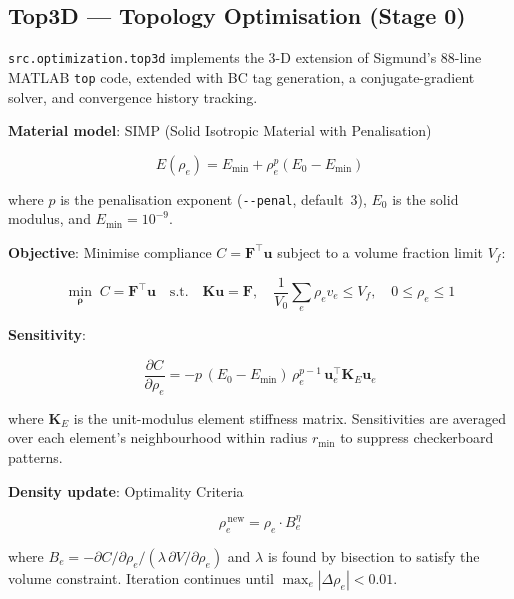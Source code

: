 \documentclass[a4paper, 11pt, openany]{report}
\begin{document}
\subsection{Top3D --- Topology Optimisation (Stage 0)}
\label{sec:alg-top3d}

\texttt{src.optimization.top3d} implements the 3-D extension of Sigmund's
88-line MATLAB \texttt{top} code, extended with BC tag generation, a
conjugate-gradient solver, and convergence history tracking.

\textbf{Material model}: SIMP (Solid Isotropic Material with Penalisation)

\begin{equation}
\label{eq:simp}
E(\rho_e) = E_{\min} + \rho_e^p (E_0 - E_{\min})
\end{equation}

where $p$ is the penalisation exponent (\texttt{-{}-penal}, default~3),
$E_0$ is the solid modulus, and $E_{\min} = 10^{-9}$.

\textbf{Objective}: Minimise compliance $C = \mathbf{F}^\top \mathbf{u}$
subject to a volume fraction limit $V_f$:

\begin{equation}
\label{eq:top3d-obj}
\min_{\boldsymbol{\rho}} \; C = \mathbf{F}^\top \mathbf{u}
\quad \text{s.t.} \quad
\mathbf{K}\mathbf{u} = \mathbf{F}, \quad
\frac{1}{V_0}\sum_e \rho_e v_e \le V_f, \quad
0 \le \rho_e \le 1
\end{equation}

\textbf{Sensitivity}:

\begin{equation}
\label{eq:sensitivity}
\frac{\partial C}{\partial \rho_e}
= -p\,(E_0 - E_{\min})\,\rho_e^{p-1}\,
  \mathbf{u}_e^\top \mathbf{K}_E \mathbf{u}_e
\end{equation}

where $\mathbf{K}_E$ is the unit-modulus element stiffness matrix.
Sensitivities are averaged over each element's neighbourhood within radius
$r_{\min}$ to suppress checkerboard patterns.

\textbf{Density update}: Optimality Criteria

\begin{equation}
\label{eq:oc-update}
\rho_e^{\,\text{new}} = \rho_e \cdot B_e^{\eta}
\end{equation}

where $B_e = -\partial C/\partial \rho_e / (\lambda\,\partial V/\partial \rho_e)$
and $\lambda$ is found by bisection to satisfy the volume constraint.
Iteration continues until $\max_e |\Delta\rho_e| < 0.01$.
\end{document}

